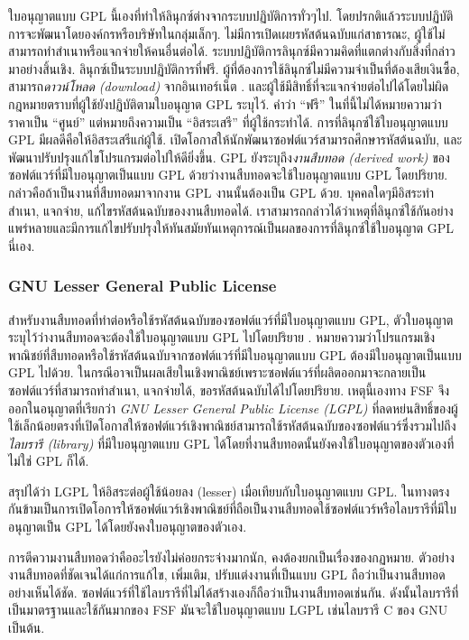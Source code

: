 \begin{thwbr}
{ใบอนุญาตแบบ GPL นี้เองที่ทำให้ลินุกซ์ต่างจากระบบปฏิบัติการทั่วๆไป. โดยปรกติแล้วระบบปฏิบัติการจะพัฒนาโดยองค์กรหรือบริษัทในกลุ่มเล็กๆ. ไม่มีการเปิดเผยรหัสต้นฉบับแก่สาธารณะ, ผู้ใช้ไม่สามารถทำสำเนาหรือแจกจ่ายให้คนอื่นต่อได้. ระบบปฏิบัติการลินุกซ์มีความคิดที่แตกต่างกับสิ่งที่กล่าวมาอย่างสิ้นเชิง. ลินุกซ์เป็นระบบปฏิบัติการที่ฟรี. ผู้ที่ต้องการใช้ลินุกซ์ไม่มีความจำเป็นที่ต้องเสียเงินซื้อ, สามารถ{\em ดาวน์โหลด (download)}
จากอินเทอร์เน็ต \cite{kernel}. และผู้ใช้มีสิทธิ์ที่จะแจกจ่ายต่อไปได้โดยไม่ผิดกฎหมายตราบที่ผู้ใช้ยังปฏิบัติตามใบอนุญาต GPL ระบุไว้. คำว่า ``ฟรี'' ในที่นี้ไม่ได้หมายความว่าราคาเป็น ``ศูนย์'' แต่หมายถึงความเป็น ``อิสระเสรี'' ที่ผู้ใช้กระทำได้. การที่ลินุกซ์ใช้ใบอนุญาตแบบ GPL มีผลดีคือให้อิสระเสรีแก่ผู้ใช้. เปิดโอกาสให้นักพัฒนาซอฟต์แวร์สามารถศึกษารหัสต้นฉบับ, และพัฒนาปรับปรุงแก้ไขโปรแกรมต่อไปให้ดียิ่งขึ้น. GPL ยังระบุถึง{\em งานสืบทอด (derived work)} ของซอฟต์แวร์ที่มีใบอนุญาตเป็นแบบ GPL ด้วยว่างานสืบทอดจะใช้ใบอนุญาตแบบ GPL โดยปริยาย. กล่าวคือถ้าเป็นงานที่สืบทอดมาจากงาน GPL งานนั้นต้องเป็น GPL ด้วย. บุคคลใดๆมีอิสระทำสำเนา, แจกจ่าย, แก้ไขรหัสต้นฉบับของงานสืบทอดได้. เราสามารถกล่าวได้ว่าเหตุที่ลินุกซ์ใช้กันอย่างแพร่หลายและมีการแก้ไขปรับปรุงให้ทันสมัยทันเหตุการณ์เป็นผลของการที่ลินุกซ์ใช้ใบอนุญาต GPL นี่เอง.

\subsubsection{GNU Lesser General Public License}
สำหรับงานสืบทอดที่ทำต่อหรือใช้รหัสต้นฉบับของซอฟต์แวร์ที่มีใบอนุญาตแบบ GPL, ตัวใบอนุญาตระบุไว้ว่างานสืบทอดจะต้องใช้ใบอนุญาตแบบ GPL ไปโดยปริยาย \cite{gpl}. หมายความว่าโปรแกรมเชิงพาณิชย์ที่สืบทอดหรือใช้รหัสต้นฉบับจากซอฟต์แวร์ที่มีใบอนุญาตแบบ GPL ต้องมีใบอนุญาตเป็นแบบ GPL ไปด้วย. ในกรณีอาจเป็นผลเสียในเชิงพาณิชย์เพราะซอฟต์แวร์ที่ผลิตออกมาจะกลายเป็นซอฟต์แวร์ที่สามารถทำสำเนา, แจกจ่ายได้, ขอรหัสต้นฉบับได้ไปโดยปริยาย. เหตุนี้เองทาง FSF จึงออกในอนุญาตที่เรียกว่า {\em GNU Lesser General Public License (LGPL)} ที่ลดหย่นสิทธิ์ของผู้ใช้เล็กน้อยตรงที่เปิดโอกาสให้ซอฟต์แวร์เชิงพาณิชย์สามารถใช้รหัสต้นฉบับของซอฟต์แวร์ซึ่งรวมไปถึง{\em ไลบรารี (library)} ที่มีใบอนุญาตแบบ GPL ได้โดยที่งานสืบทอดนั้นยังคงใช้ใบอนุญาตของตัวเองที่ไม่ใช่ GPL ก็ได้.

สรุปได้ว่า LGPL ให้อิสระต่อผู้ใช้น้อยลง (lesser) เมื่อเทียบกับใบอนุญาตแบบ GPL. ในทางตรงกันข้ามเป็นการเปิดโอการให้ซอฟต์แวร์เชิงพาณิชย์ที่ถือเป็นงานสืบทอดใช้ซอฟต์แวร์หรือไลบรารีที่มีใบอนุญาตเป็น GPL ได้โดยยังคงใบอนุญาตของตัวเอง. 

การตีความงานสืบทอดว่าคืออะไรยังไม่ค่อยกระจ่างมากนัก, คงต้องยกเป็นเรื่องของกฏหมาย. ตัวอย่างงานสืบทอดที่ชัดเจนได้แก่การแก้ไข, เพิ่มเติม, ปรับแต่งงานที่เป็นแบบ GPL ถือว่าเป็นงานสืบทอดอย่างเห็นได้ชัด. ซอฟต์แวร์ที่ใช้ไลบรารีที่ไม่ได้สร้างเองก็ถือว่าเป็นงานสืบทอดเช่นกัน. ดังนั้นไลบรารีที่เป็นมาตรฐานและใช้กันมากของ FSF มันจะใช้ใบอนุญาตแบบ LGPL เช่นไลบรารี C ของ GNU เป็นต้น.



}
\end{thwbr}
